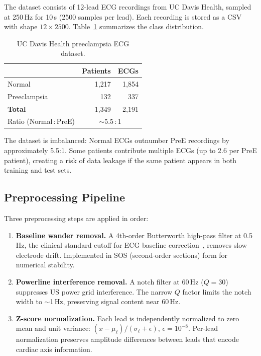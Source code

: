 \documentclass[sigconf,nonacm]{acmart}
\begin{document}
The dataset consists of 12-lead ECG recordings from UC Davis Health, sampled at 250\,Hz for 10\,s (2500 samples per lead). Each recording is stored as a CSV with shape $12 \times 2500$. Table~\ref{tab:dataset} summarizes the class distribution.

\begin{table}[H]
\centering
\caption{UC Davis Health preeclampsia ECG dataset.}
\label{tab:dataset}
\small
\begin{tabular}{lrr}
\toprule
 & \textbf{Patients} & \textbf{ECGs} \\
\midrule
Normal     & 1{,}217 & 1{,}854 \\
Preeclampsia & 132   & 337 \\
\midrule
\textbf{Total} & 1{,}349 & 2{,}191 \\
Ratio (Normal\,:\,PreE) & \multicolumn{2}{c}{$\sim$5.5\,:\,1} \\
\bottomrule
\end{tabular}
\end{table}

The dataset is imbalanced: Normal ECGs outnumber PreE recordings by approximately 5.5:1. Some patients contribute multiple ECGs (up to 2.6 per PreE patient), creating a risk of data leakage if the same patient appears in both training and test sets.

\subsection{Preprocessing Pipeline}

Three preprocessing steps are applied in order:
\begin{enumerate}
\item \textbf{Baseline wander removal.} A 4th-order Butterworth high-pass filter at 0.5\,Hz, the clinical standard cutoff for ECG baseline correction~\cite{jia_preprocessing_2024}, removes slow electrode drift. Implemented in SOS (second-order sections) form for numerical stability.
\item \textbf{Powerline interference removal.} A notch filter at 60\,Hz ($Q = 30$) suppresses US power grid interference. The narrow $Q$ factor limits the notch width to $\sim$1\,Hz, preserving signal content near 60\,Hz.
\item \textbf{Z-score normalization.} Each lead is independently normalized to zero mean and unit variance: $(x - \mu_\ell) / (\sigma_\ell + \epsilon)$, $\epsilon = 10^{-8}$. Per-lead normalization preserves amplitude differences between leads that encode cardiac axis information.
\end{enumerate}
\end{document}
